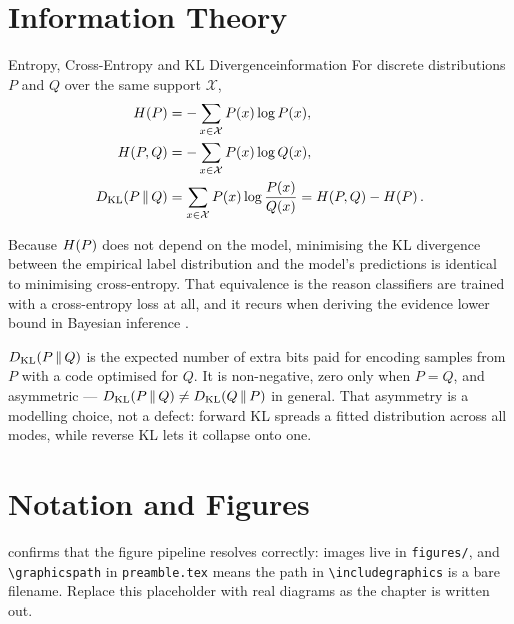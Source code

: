 
\section{Information Theory}
\label{sec:information-theory}

\begin{definition}{Entropy, Cross-Entropy and KL Divergence}{information}
    For discrete distributions $P$ and $Q$ over the same support $\mathcal{X}$,
    \begin{align*}
        H\!\left(P\right)    &= -\sum_{x \in \mathcal{X}} P(x)\log P(x), \\
        H(P, Q)    &= -\sum_{x \in \mathcal{X}} P(x)\log Q(x), \\
        D_{\mathrm{KL}}\!\left(P \,\|\, Q\right)  &= \sum_{x \in \mathcal{X}} P(x)\log\frac{P(x)}{Q(x)}
                    = H(P,Q) - H\!\left(P\right) .
    \end{align*}
\end{definition}

Because $H\!\left(P\right)$ does not depend on the model, minimising the KL divergence
between the empirical label distribution and the model's predictions is
identical to minimising cross-entropy. That equivalence is the reason
classifiers are trained with a cross-entropy loss at all, and it recurs when
deriving the evidence lower bound in Bayesian inference \autocite{bishop2006prml}.

\begin{intuition}
    $D_{\mathrm{KL}}\!\left(P \,\|\, Q\right)$ is the expected number of extra bits paid for encoding samples
    from $P$ with a code optimised for $Q$. It is non-negative, zero only when
    $P = Q$, and asymmetric --- $D_{\mathrm{KL}}\!\left(P \,\|\, Q\right) \neq D_{\mathrm{KL}}\!\left(Q \,\|\, P\right)$ in general. That
    asymmetry is a modelling choice, not a defect: forward KL spreads a fitted
    distribution across all modes, while reverse KL lets it collapse onto one.
\end{intuition}

\section{Notation and Figures}
\label{sec:notation}

 confirms that the figure pipeline resolves correctly:
images live in \texttt{figures/}, and \texttt{\textbackslash graphicspath} in
\texttt{preamble.tex} means the path in \texttt{\textbackslash includegraphics}
is a bare filename. Replace this placeholder with real diagrams as the chapter
is written out.

